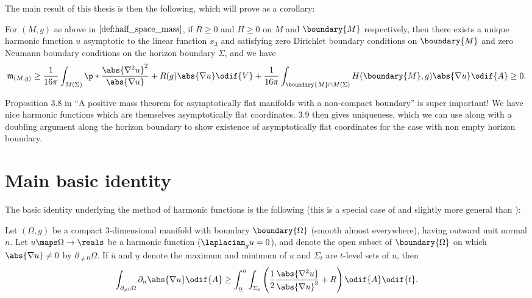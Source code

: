 \documentclass[titlepage,numbers=noenddot,headinclude,oneside,%
footinclude=true,cleardoublepage=empty,%
BCOR=5mm,paper=a4,fontsize=11pt,%
english,%
]{scrartcl}
\newcommand{\mass}[2]{\mathfrak{m}_{(#1,#2)}} %
\begin{document}
The main result of this thesis is then the following, which will prove  as a corollary:
\begin{theorem}\label{thm:main_result}
    For \( (M,g) \) as above in \( \Cref{def:half_space_mass} \), if \( R\geq 0 \) and \( H\geq 0 \) on \( M \) and \( \boundary{M} \) respectively, then there exists a unique harmonic function \( u \) asymptotic to the linear function \( x_3 \) and satisfying zero Dirichlet boundary conditions on \( \boundary{M} \) and zero Neumann boundary conditions on the horizon boundary \( \Sigma \), and we have
    \begin{equation*}
        \mass{M}{g}\geq \frac{1}{16\pi}\int_{M(\Sigma)}\p*{\frac{\abs{\nabla^2 u}^2}{\abs{\nabla u}}+R(g)\abs{\nabla u}}\odif{V}+\frac{1}{16\pi}\int_{\boundary{M}\cap M(\Sigma)}H(\boundary{M},g)\abs{\nabla u}\odif{A}\geq 0.
    \end{equation*} 
\end{theorem} 

Proposition 3.8 in \enquote{A positive mass theorem for
asymptotically flat manifolds with
a non-compact boundary} is super important! We have nice harmonic functions which are themselves asymptotically flat coordinates. 3.9 then gives uniqueness, which we can use along with a doubling argument along the horizon boundary to show existence of asymptotically flat coordinates for the case with non empty horizon boundary.

\section{Main basic identity}
The basic identity underlying the method of harmonic functions is the following (this is a special case of \cite[Proposition 3.2]{hirschSpacetimeHarmonicFunctions2021} and slightly more general than \cite[Proposition 4.2]{brayHarmonicFunctionsMass2019}):
{\newcommand{\maxu}{\bar{u}}
\newcommand{\minu}{\underline{u}}
\newcommand{\nonzeroboundary}{\partial_{\neq 0}\Omega}
\begin{proposition}\label{prop:main_identity}
    Let \( (\Omega,g) \) be a compact 3-dimensional manifold with boundary \( \boundary{\Omega} \) (smooth almost everywhere), having outward unit normal \( n \). Let \( u\maps \Omega\to \reals \) be a harmonic function (\ie \( \laplacian_g u=0 \)), and denote the open subset of \( \boundary{\Omega} \) on which \( \abs{\nabla u}\neq 0 \) by \( \nonzeroboundary \). If \( \maxu \) and \( \minu \) denote the maximum and minimum of \( u \) and \( \Sigma_t \) are \( t \)-level sets of \( u \), then
    \begin{equation*}
        \int_{\nonzeroboundary}\partial_n \abs{\nabla u}\odif{A}\geq \int_{\minu}^{\maxu}\int_{\Sigma_t}\left( \frac{1}{2}\frac{\abs{\nabla^2 u}}{\abs{\nabla u}^2}+R \right)\odif{A}\odif{t}.
    \end{equation*} 
\end{proposition}
}
\end{document}
